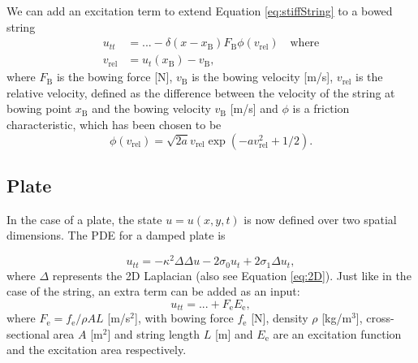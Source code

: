 \documentclass{article}
\begin{document}
We can add an excitation term to extend Equation \eqref{eq:stiffString} to a bowed string \cite{Bilbao2009:NumericalSoundSynthesis} 
\begin{align}
    \label{eq:bowedString} u_{tt} &= ... - \delta(x-x_\text{B})F_\text{B}\phi(v_\text{rel}) \quad \text{where} \\
    v_\text{rel} &= u_t(x_\text{B}) - v_\text{B},
\end{align}
where $F_\text{B}$ is the bowing force [N], $v_\text{B}$ is the bowing velocity [m/s], $v_\text{rel}$ is the relative velocity, defined as the difference between the velocity of the string at bowing point $x_\text{B}$ and the bowing velocity $v_\text{B}$ [m/s] and $\phi$ is a friction characteristic, which has been chosen to be \cite{Bilbao2009:NumericalSoundSynthesis}
\begin{equation}
    \phi(v_\text{rel}) = \sqrt{2a}v_\text{rel} \exp(-av_\text{rel}^2+1/2).
\end{equation}

\subsection{Plate}\label{subsec:platePDE}
In the case of a plate, the state $u = u(x,y,t)$ is now defined over two spatial dimensions. The PDE for a damped plate is \cite{Bilbao2009:NumericalSoundSynthesis}

\begin{equation}\label{eq:platePDE}
    u_{tt} = -\kappa^2 \Delta\Delta u - 2 \sigma_0 u_{t} + 2\sigma_1 \Delta u_{t},
\end{equation}
where $\Delta$ represents the 2D Laplacian (also see Equation \eqref{eq:2D}). Just like in the case of the string, an extra term can be added as an input:
\begin{equation}\label{eq:plateExcitation}
    u_{tt} = ... + F_\text{e}E_\text{e},
\end{equation}
where $F_\text{e} = f_\text{e}/ \rho AL$ [m/s$^2$], with bowing force $f_\text{e}$ [N], density $\rho$ [kg/m$^3$], cross-sectional area $A$ [m$^2$] and string length $L$ [m] and $E_\text{e}$ are an excitation function and the excitation area respectively. 
\end{document}

